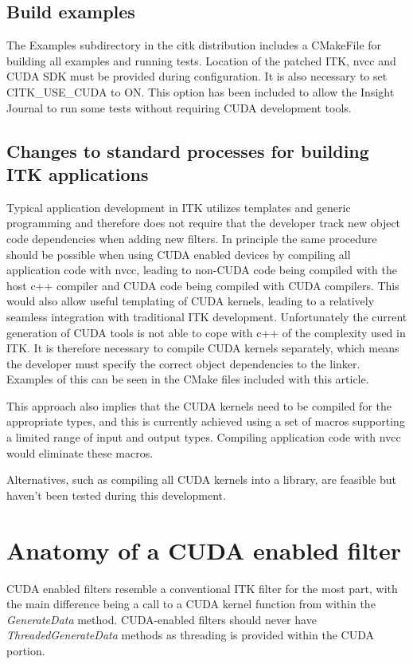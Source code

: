 \documentclass{InsightArticle}
\begin{document}
\subsection{Build examples}
The Examples subdirectory in the citk distribution includes a
CMakeFile for building all examples and running tests. Location of the
patched ITK, nvcc and CUDA SDK must be provided during
configuration. It is also necessary to set CITK\_USE\_CUDA to ON. This
option has been included to allow the Insight Journal to run some
tests without requiring CUDA development tools.

\subsection{Changes to standard processes for building ITK applications}
Typical application development in ITK utilizes templates and generic
programming and therefore does not require that the developer track
new object code dependencies when adding new filters. In principle the
same procedure should be possible when using CUDA enabled devices by
compiling all application code with nvcc, leading to non-CUDA code
being compiled with the host c++ compiler and CUDA code being compiled
with CUDA compilers. This would also allow useful templating of CUDA
kernels, leading to a relatively seamless integration with traditional
ITK development. Unfortunately the current generation of CUDA tools is
not able to cope with c++ of the complexity used in ITK. It is
therefore necessary to compile CUDA kernels separately, which means
the developer must specify the correct object dependencies to the
linker. Examples of this can be seen in the CMake files included with
this article.

This approach also implies that the CUDA kernels need to be compiled
for the appropriate types, and this is currently achieved using a set
of macros supporting a limited range of input and output
types. Compiling application code with nvcc would eliminate these
macros.

Alternatives, such as compiling all CUDA kernels into a library, are
feasible but haven't been tested during this development.



\section{Anatomy of a CUDA enabled filter}
CUDA enabled filters resemble a conventional ITK filter for the most part,
with the main difference being a call to a CUDA kernel function from
within the {\em GenerateData} method. CUDA-enabled filters should
never have {\em ThreadedGenerateData} methods as threading is provided
within the CUDA portion.
\end{document}
